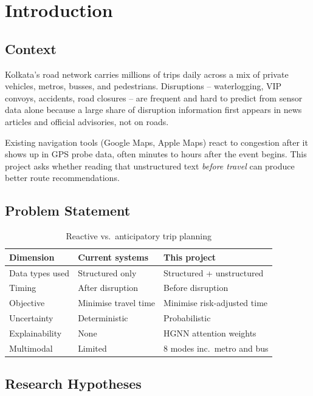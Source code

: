 \chapter{Introduction}

\section{Context}

Kolkata's road network carries millions of trips daily across a mix of private
vehicles, metros, busses, and pedestrians. Disruptions -- waterlogging, VIP
convoys, accidents, road closures -- are frequent and hard to predict from
sensor data alone because a large share of disruption information first appears
in news articles and official advisories, not on roads.

Existing navigation tools (Google Maps, Apple Maps) react to congestion after
it shows up in GPS probe data, often minutes to hours after the event begins.
This project asks whether reading that unstructured text \textit{before travel}
can produce better route recommendations.

\section{Problem Statement}

\begin{table}[H]
\centering

\begin{tabular}{lll}
\toprule
\textbf{Dimension} & \textbf{Current systems} & \textbf{This project} \\
\midrule
Data types used     & Structured only          & Structured + unstructured \\
Timing              & After disruption         & Before disruption \\
Objective           & Minimise travel time     & Minimise risk-adjusted time \\
Uncertainty         & Deterministic            & Probabilistic \\
Explainability      & None                     & HGNN attention weights \\
Multimodal          & Limited                  & 8 modes inc.\ metro and bus \\
\bottomrule
\end{tabular}
\caption{Reactive vs.\ anticipatory trip planning}
\end{table}

\section{Research Hypotheses}

